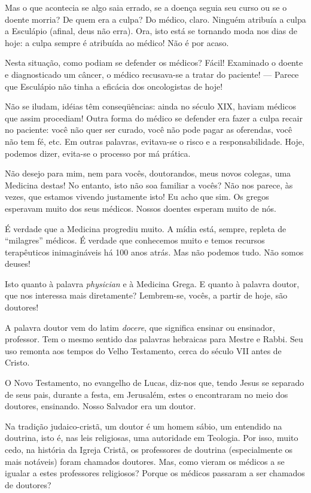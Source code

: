 \documentclass[pdftex, brazil, 12pt, oneside]{article}
\newcommand{\ingles}[1]{\textit{#1}}
\begin{document}
Mas o que acontecia se algo saia errado, se a doença seguia seu curso ou se o doente morria?
De quem era a culpa? Do médico, claro. Ninguém atribuía a culpa a Esculápio (afinal, deus não erra).
Ora, isto está se tornando moda nos dias de hoje: a culpa sempre é atribuída ao médico! Não é por acaso.

Nesta situação, como podiam se defender os médicos? Fácil! Examinado o doente e diagnosticado um câncer,
o médico recusava-se a tratar do paciente! --- Parece que Esculápio não tinha a eficácia dos oncologistas
de hoje!

Não se iludam, idéias têm conseqüências: ainda no século XIX, haviam médicos que assim procediam!
Outra forma do médico se defender era fazer a culpa recair no paciente: você não quer ser curado,
você não pode pagar as oferendas, você não tem fé, etc. Em outras palavras, evitava-se o risco e
a responsabilidade. Hoje, podemos dizer, evita-se o processo por má prática.

Não desejo para mim, nem para vocês, doutorandos, meus novos colegas, uma Medicina destas!
No entanto, isto não soa familiar a vocês? Não nos parece, às vezes, que estamos vivendo justamente
isto! Eu acho que sim. Os gregos esperavam muito dos seus médicos. Nossos doentes esperam muito de nós.

É verdade que a Medicina progrediu muito. A mídia está, sempre, repleta de ``milagres'' médicos.
É verdade que conhecemos muito e temos recursos terapêuticos inimagináveis há 100 anos atrás.
Mas não podemos tudo. Não somos deuses!

Isto quanto à palavra \ingles{physician} e à Medicina Grega. E quanto à palavra doutor, que nos
interessa mais diretamente? Lembrem-se, vocês, a partir de hoje, são doutores!

A palavra doutor vem do latim \ingles{docere}, que significa ensinar ou ensinador, professor.
Tem o mesmo sentido das palavras hebraicas para Mestre e Rabbi. Seu uso remonta aos tempos do
Velho Testamento, cerca do século VII antes de Cristo.

O Novo Testamento, no evangelho de Lucas, diz-nos que, tendo Jesus se separado de seus pais,
durante a festa, em Jerusalém, estes o encontraram no meio dos doutores, ensinando.
Nosso Salvador era um doutor.

Na tradição judaico-cristã, um doutor é um homem sábio, um entendido na doutrina, isto é,
nas leis religiosas, uma autoridade em Teologia. Por isso, muito cedo, na história da Igreja Cristã,
os professores de doutrina (especialmente os mais notáveis) foram chamados doutores.
Mas, como vieram os médicos a se igualar a estes professores religiosos? Porque os médicos
passaram a ser chamados de doutores?
\end{document}
